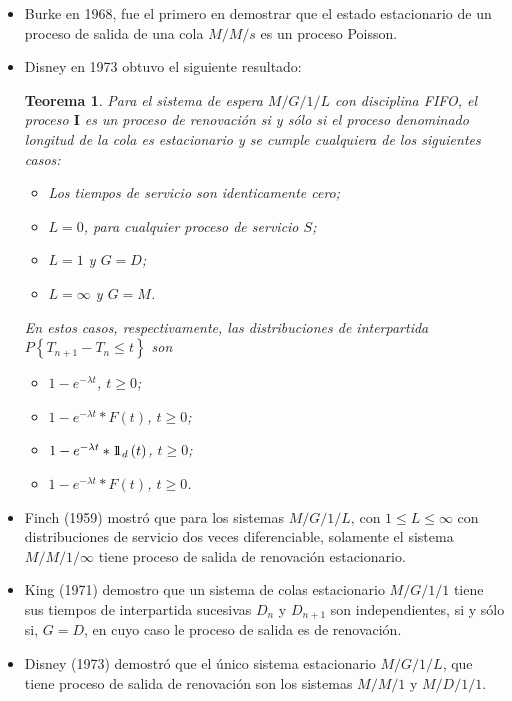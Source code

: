 \documentclass{article}
\newtheorem{Teo}{Teorema}[section]
\newcommand{\indora}{\mbox{$1$\hspace{-0.8ex}$1$}}
\numberwithin{equation}{section}
\begin{document}
{\begin{itemize}
\item Burke en 1968, fue el primero en demostrar que el estado estacionario de un proceso de salida de una cola $M/M/s$ es un proceso Poisson.

\item Disney en 1973 obtuvo el siguiente resultado:

\begin{Teo}
Para el sistema de espera $M/G/1/L$ con disciplina FIFO, el proceso $\textbf{I}$ es un proceso de renovaci\'on si y s\'olo si el proceso denominado longitud de la cola es estacionario y se cumple cualquiera de los siguientes casos:

\begin{itemize}
\item[a)] Los tiempos de servicio son identicamente cero;
\item[b)] $L=0$, para cualquier proceso de servicio $S$;
\item[c)] $L=1$ y $G=D$;
\item[d)] $L=\infty$ y $G=M$.
\end{itemize}
En estos casos, respectivamente, las distribuciones de interpartida $P\left\{T_{n+1}-T_{n}\leq t\right\}$ son


\begin{itemize}
\item[a)] $1-e^{-\lambda t}$, $t\geq0$;
\item[b)] $1-e^{-\lambda t}*F\left(t\right)$, $t\geq0$;
\item[c)] $1-e^{-\lambda t}*\indora_{d}\left(t\right)$, $t\geq0$;
\item[d)] $1-e^{-\lambda t}*F\left(t\right)$, $t\geq0$.
\end{itemize}
\end{Teo}


\item Finch (1959) mostr\'o que para los sistemas $M/G/1/L$, con $1\leq L\leq \infty$ con distribuciones de servicio dos veces diferenciable, solamente el sistema $M/M/1/\infty$ tiene proceso de salida de renovaci\'on estacionario.

\item King (1971) demostro que un sistema de colas estacionario $M/G/1/1$ tiene sus tiempos de interpartida sucesivas $D_{n}$ y $D_{n+1}$ son independientes, si y s\'olo si, $G=D$, en cuyo caso le proceso de salida es de renovaci\'on.

\item Disney (1973) demostr\'o que el \'unico sistema estacionario $M/G/1/L$, que tiene proceso de salida de renovaci\'on  son los sistemas $M/M/1$ y $M/D/1/1$.




\end{itemize}}
\end{document}
